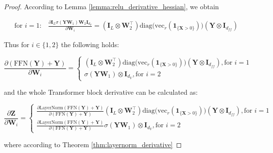 \documentclass{article}
\begin{document}
\begin{proof}
According to Lemma \ref{lemma:relu_derivative_hessian}, we obtain

\begin{align*}
    \text{for } i = 1:& \frac{\partial \mathbf{I}_L \sigma(\mathbf{Y}\mathbf{W}_1)\mathbf{W}_2 \mathbf{I}_{d_V}}{\partial \mathbf{W}_i} = \left(\mathbf{I}_L \otimes \mathbf{W}_2^\top \right) \mathrm{diag}\!\big(\mathrm{vec}_r(\mathbf{1}_{\{\mathbf{X}>0\}})\big) \left( \mathbf{Y} \otimes \mathbf{I}_{d_{ff}}\right)
\end{align*}

Thus for $i \in \{1, 2\}$ the following holds:

\begin{equation*}
    \frac{\partial (\text{FFN}(\mathbf{Y}) + \mathbf{Y})}{\partial \mathbf{W}_i} = \begin{cases}
        \left(\mathbf{I}_L \otimes \mathbf{W}_2^\top \right) \mathrm{diag}\!\big(\mathrm{vec}_r(\mathbf{1}_{\{\mathbf{X}>0\}})\big) \left( \mathbf{Y} \otimes \mathbf{I}_{d_{ff}}\right), \text{for } i = 1 \\
        \sigma(\mathbf{Y} \mathbf{W}_1) \otimes \mathbf{I}_{d_V}, \text{for } i = 2
    \end{cases}
\end{equation*}

and the whole Transformer block derivative can be calculated as:

\begin{equation*}
    \frac{\partial\mathbf{Z}}{\partial \mathbf{W}_i} = \begin{cases}
        \frac{\partial \text{LayerNorm}(\text{FFN}(\mathbf{Y}) + \mathbf{Y})}{\partial (\text{FFN}(\mathbf{Y}) + \mathbf{Y})}\left(\mathbf{I}_L \otimes \mathbf{W}_2^\top \right) \mathrm{diag}\!\big(\mathrm{vec}_r(\mathbf{1}_{\{\mathbf{X}>0\}})\big) \left( \mathbf{Y} \otimes \mathbf{I}_{d_{ff}}\right), \text{for } i = 1 \\
        \frac{\partial \text{LayerNorm}(\text{FFN}(\mathbf{Y}) + \mathbf{Y})}{\partial (\text{FFN}(\mathbf{Y}) + \mathbf{Y})}\sigma(\mathbf{Y} \mathbf{W}_1) \otimes \mathbf{I}_{d_V}, \text{for } i = 2
    \end{cases}
\end{equation*}

where according to Theorem \ref{thm:layernorm_derivative}


\end{proof}
\end{document}
